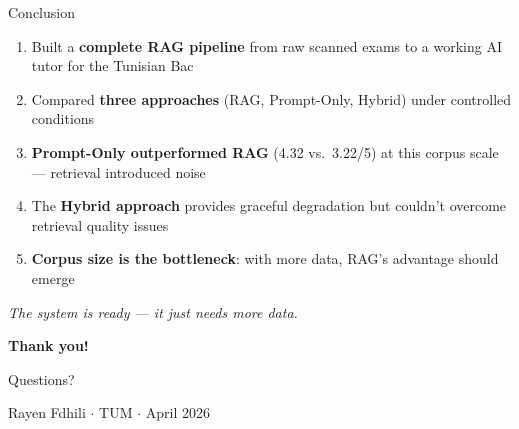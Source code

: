 \documentclass[aspectratio=169, 11pt]{beamer}
\begin{document}
\begin{frame}{Conclusion}

\begin{enumerate}
    \item Built a \textbf{complete RAG pipeline} from raw scanned exams to
          a working AI tutor for the Tunisian Bac

    \item Compared \textbf{three approaches} (RAG, Prompt-Only, Hybrid)
          under controlled conditions

    \item \textbf{Prompt-Only outperformed RAG} (4.32 vs.\ 3.22/5) at this
          corpus scale --- retrieval introduced noise

    \item The \textbf{Hybrid approach} provides graceful degradation but
          couldn't overcome retrieval quality issues

    \item \textbf{Corpus size is the bottleneck}: with more data,
          RAG's advantage should emerge
\end{enumerate}

\bigskip

\begin{center}
\textit{The system is ready --- it just needs more data.}
\end{center}

\end{frame}


\begin{frame}[plain]
\begin{center}
\vspace{2cm}
{\Large \textbf{Thank you!}}

\bigskip

{\large Questions?}

\vspace{1.5cm}

{\small Rayen Fdhili \quad $\cdot$ \quad TUM \quad $\cdot$ \quad April 2026}
\end{center}
\end{frame}
\end{document}
